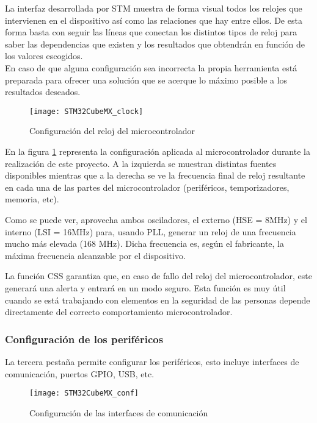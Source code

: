 La interfaz desarrollada por STM muestra de forma visual todos los relojes que intervienen en el dispositivo así como las relaciones que hay entre ellos. De esta forma basta con seguir las líneas que conectan los distintos tipos de reloj para saber las dependencias que existen y los resultados que obtendrán en función de los valores escogidos.
\\En caso de que alguna configuración sea incorrecta la propia herramienta está preparada para ofrecer una solución que se acerque lo máximo posible a los resultados deseados.

\begin{figure} [h]
    \centering
    \texttt{[image: STM32CubeMX\_clock]}
    \caption{Configuración del reloj del microcontrolador}
    \label{fig:STM32CubeMX_clock}
\end{figure}

En la figura \ref{fig:STM32CubeMX_clock} representa la configuración aplicada al microcontrolador durante la realización de este proyecto. A la izquierda se muestran distintas fuentes disponibles mientras que a la derecha se ve la frecuencia final de reloj resultante en cada una de las partes del microcontrolador (periféricos, temporizadores, memoria, etc).

Como se puede ver, aprovecha ambos osciladores, el externo (\acrshort{HSE} = 8MHz) y el interno (\acrshort{LSI} = 16MHz) para, usando \acrshort{PLL}, generar un reloj de una frecuencia mucho más elevada (168 MHz). Dicha frecuencia es, según el fabricante, la máxima frecuencia alcanzable por el dispositivo.

La función \acrshort{CSS} garantiza que, en caso de fallo del reloj del microcontrolador, este generará una alerta y entrará en un modo seguro. Esta función es muy útil cuando se está trabajando con elementos en la seguridad de las personas depende directamente del correcto comportamiento microcontrolador.

\clearpage

\subsubsection{Configuración de los periféricos\label{Configuracion_micro_com}}

La tercera pestaña permite configurar los periféricos, esto incluye interfaces de comunicación, puertos GPIO, USB, etc.

\begin{figure} [h]
    \centering
    \texttt{[image: STM32CubeMX\_conf]}
    \caption{Configuración de las interfaces de comunicación}
    \label{fig:STM32CubeMX_conf}
\end{figure}

